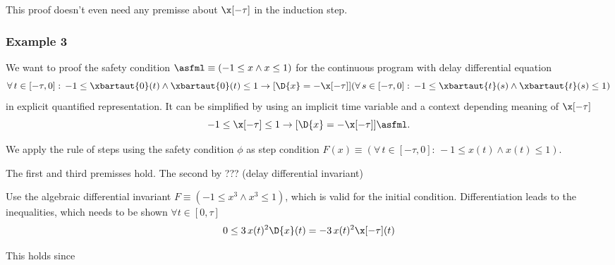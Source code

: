             This proof doesn't even need any premisse about $\x[-\tau]$ in the induction step.

        \subsubsection{Example 3}
            \label{sec:ddi-example-3}

            We want to proof the safety condition $\asfml\equiv(-1\leq x\wedge x\leq 1)$ for the continuous program with delay differential equation
            \begin{equation}
                \forall\,t\in[-\tau,0]:\,-1\leq\xbartaut{0}(t)\wedge\xbartaut{0}(t)\leq 1
                \rightarrow
                [\D{x}=-\x[-\tau]] (\forall\,s\in[-\tau,0]:\,-1\leq\xbartaut{t}(s)\wedge\xbartaut{t}(s)\leq 1)
            \end{equation}
            in explicit quantified representation. It can be simplified by using an implicit time variable and a context depending meaning of $\x[-\tau]$
            \begin{equation}
                -1\leq\x[-\tau]\leq 1 \rightarrow [\D{x}=-\x[-\tau]]\asfml.
            \end{equation}

            We apply the rule of steps using the safety condition $\phi$ as step condition $F(x)\equiv(\forall\,t\in[-\tau,0]:\,-1\leq x(t)\wedge x(t)\leq 1)$.

            The first and third premisses hold. The second by ??? (delay differential invariant)

            Use the algebraic differential invariant $F\equiv(-1\leq x^3\wedge x^3\leq1)$, which is valid for the initial condition. Differentiation leads to the inequalities, which needs to be shown $\forall t\in[0,\tau]$
            \begin{equation}
                0\leq 3\,x(t)^2 \D{x}(t) = -3\,x(t)^2 \x[-\tau](t)
            \end{equation}

            This holds since

